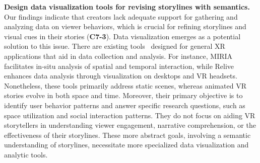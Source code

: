 \textbf{Design data visualization tools for revising storylines with semantics.}
Our findings indicate that creators lack adequate support for gathering and analyzing data on viewer behaviors, which is crucial for refining storylines and visual cues in their stories (\textbf{C7-3}). Data visualization emerges as a potential solution to this issue. There are existing tools~\cite{nebeling2020mrat, buschel2021miria, hubenschmid2022relive} designed for general XR applications that aid in data collection and analysis. For instance, MIRIA~\cite{buschel2021miria} facilitates in-situ analysis of spatial and temporal interaction, while Relive~\cite{hubenschmid2022relive} enhances data analysis through visualization on desktops and VR headsets. Nonetheless, these tools primarily address static scenes, whereas animated VR stories evolve in both space and time. Moreover, their primary objective is to identify user behavior patterns and answer specific research questions, such as space utilization and social interaction patterns. They do not focus on aiding VR storytellers in understanding viewer engagement, narrative comprehension, or the effectiveness of their storylines. These more abstract goals, involving a semantic understanding of storylines, necessitate more specialized data visualization and analytic tools.